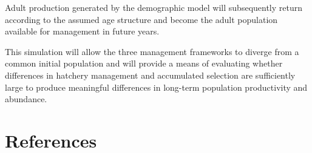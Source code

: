 \documentclass[12pt,letterpaper]{article}
\begin{document}
Adult production generated by the demographic model will subsequently return
according to the assumed age structure and become the adult population
available for management in future years.

This simulation will allow the three management frameworks to diverge from a
common initial population and will provide a means of evaluating whether
differences in hatchery management and accumulated selection are sufficiently
large to produce meaningful differences in long-term population productivity
and abundance.

\section*{References}
\printbibliography[heading=none]
\end{document}
